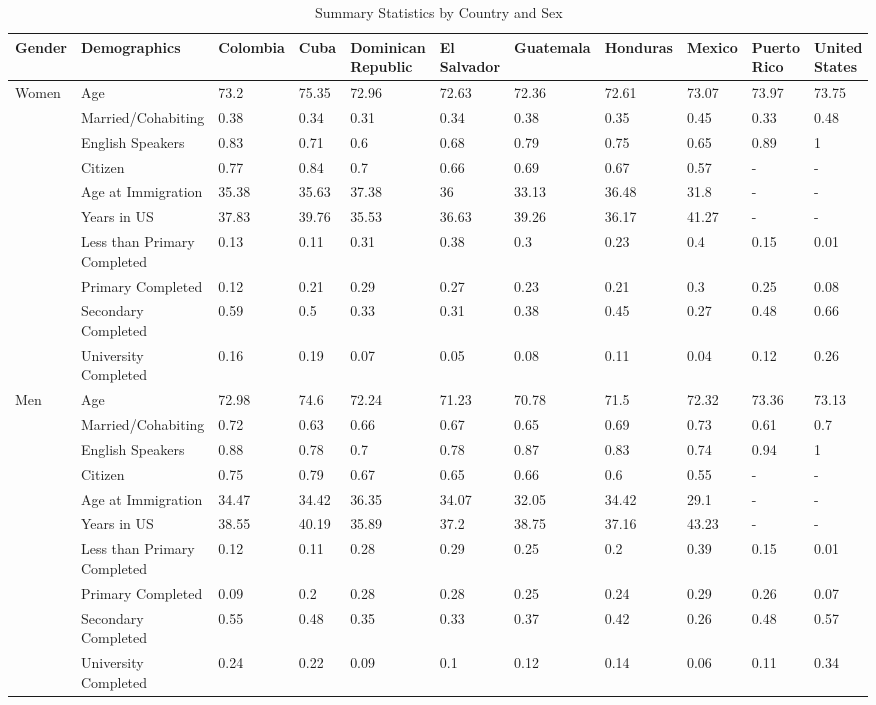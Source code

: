 \begin{table}[ht]
\centering
\caption{Summary Statistics by Country and Sex} 
\begingroup\small
\begin{tabular}{l|l|lllllllll}
  \hline
Gender & Demographics & Colombia & Cuba & Dominican Republic & El Salvador & Guatemala & Honduras & Mexico & Puerto Rico & United States \\ 
  \hline
Women & Age & 73.2 & 75.35 & 72.96 & 72.63 & 72.36 & 72.61 & 73.07 & 73.97 & 73.75 \\ 
   & Married/Cohabiting & 0.38 & 0.34 & 0.31 & 0.34 & 0.38 & 0.35 & 0.45 & 0.33 & 0.48 \\ 
   & English Speakers & 0.83 & 0.71 & 0.6 & 0.68 & 0.79 & 0.75 & 0.65 & 0.89 & 1 \\ 
   & Citizen & 0.77 & 0.84 & 0.7 & 0.66 & 0.69 & 0.67 & 0.57 & - & - \\ 
   & Age at Immigration & 35.38 & 35.63 & 37.38 & 36 & 33.13 & 36.48 & 31.8 & - & - \\ 
   & Years in US & 37.83 & 39.76 & 35.53 & 36.63 & 39.26 & 36.17 & 41.27 & - & - \\ 
   & Less than Primary Completed & 0.13 & 0.11 & 0.31 & 0.38 & 0.3 & 0.23 & 0.4 & 0.15 & 0.01 \\ 
   & Primary Completed & 0.12 & 0.21 & 0.29 & 0.27 & 0.23 & 0.21 & 0.3 & 0.25 & 0.08 \\ 
   & Secondary Completed & 0.59 & 0.5 & 0.33 & 0.31 & 0.38 & 0.45 & 0.27 & 0.48 & 0.66 \\ 
   & University Completed & 0.16 & 0.19 & 0.07 & 0.05 & 0.08 & 0.11 & 0.04 & 0.12 & 0.26 \\ 
  Men & Age & 72.98 & 74.6 & 72.24 & 71.23 & 70.78 & 71.5 & 72.32 & 73.36 & 73.13 \\ 
   & Married/Cohabiting & 0.72 & 0.63 & 0.66 & 0.67 & 0.65 & 0.69 & 0.73 & 0.61 & 0.7 \\ 
   & English Speakers & 0.88 & 0.78 & 0.7 & 0.78 & 0.87 & 0.83 & 0.74 & 0.94 & 1 \\ 
   & Citizen & 0.75 & 0.79 & 0.67 & 0.65 & 0.66 & 0.6 & 0.55 & - & - \\ 
   & Age at Immigration & 34.47 & 34.42 & 36.35 & 34.07 & 32.05 & 34.42 & 29.1 & - & - \\ 
   & Years in US & 38.55 & 40.19 & 35.89 & 37.2 & 38.75 & 37.16 & 43.23 & - & - \\ 
   & Less than Primary Completed & 0.12 & 0.11 & 0.28 & 0.29 & 0.25 & 0.2 & 0.39 & 0.15 & 0.01 \\ 
   & Primary Completed & 0.09 & 0.2 & 0.28 & 0.28 & 0.25 & 0.24 & 0.29 & 0.26 & 0.07 \\ 
   & Secondary Completed & 0.55 & 0.48 & 0.35 & 0.33 & 0.37 & 0.42 & 0.26 & 0.48 & 0.57 \\ 
   & University Completed & 0.24 & 0.22 & 0.09 & 0.1 & 0.12 & 0.14 & 0.06 & 0.11 & 0.34 \\ 
   \hline
\end{tabular}
\endgroup
\end{table}

